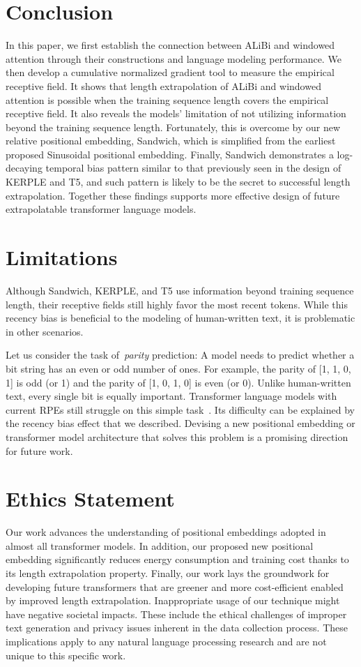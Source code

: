 \documentclass[11pt]{article}
\theoremstyle{plain}
\begin{document}
\section{Conclusion}
In this paper, we first establish the connection between ALiBi and windowed attention through their constructions and language modeling performance. We then develop a cumulative normalized gradient tool to measure the empirical receptive field. It shows that length extrapolation of ALiBi and windowed attention is possible when the training sequence length covers the empirical receptive field. It also reveals the models' limitation of not utilizing information beyond the training sequence length.
Fortunately, this is overcome by our new relative positional embedding, Sandwich, which is simplified from the earliest proposed Sinusoidal positional embedding.
Finally, Sandwich demonstrates a  log-decaying temporal bias pattern similar to that previously seen in the design of KERPLE and T5, and such pattern is likely to be the secret to successful length extrapolation.
Together these findings supports more effective design of future extrapolatable transformer language models.

\section*{Limitations}
Although Sandwich, KERPLE, and T5 use information beyond training sequence length, their receptive fields still highly favor the most recent tokens. While this recency bias is beneficial to the modeling of human-written text, it is problematic in other scenarios. 

Let us consider the task of~\emph{parity} prediction: A model needs to predict whether a bit string has an even or odd number of ones. For example, the parity of [1, 1, 0, 1] is odd (or 1) and the parity of [1, 0, 1, 0] is even (or 0). Unlike human-written text, every single bit is equally important. Transformer language models with current RPEs still struggle on this simple task~\cite{anil2022exploring}. Its difficulty can be explained by the recency bias effect that we described.
Devising a new positional embedding or transformer model architecture that solves this problem is a promising direction for future work.

\section*{Ethics Statement}
Our work advances the understanding of positional embeddings adopted in almost all transformer models. In addition, our proposed new positional embedding significantly reduces energy consumption and training cost thanks to its length extrapolation property.
Finally, our work lays the groundwork for developing future transformers that are greener and more cost-efficient enabled by improved length extrapolation.
Inappropriate usage of our technique might have negative societal impacts. These include the ethical challenges of improper text generation and  privacy issues inherent in the data collection process. 
These implications apply to any natural language processing research and are not unique to this specific work.
\end{document}
